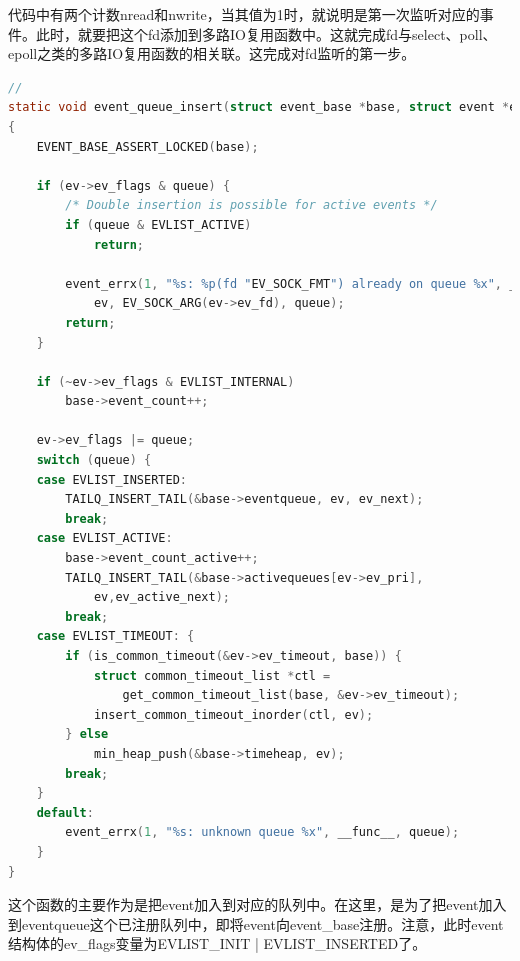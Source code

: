 \documentclass[11pt,a4paper]{article}
\begin{document}
代码中有两个计数nread和nwrite，当其值为1时，就说明是第一次监听对应的事件。此时，就要把这个fd添加到多路IO复用函数中。这就完成fd与select、poll、epoll之类的多路IO复用函数的相关联。这完成对fd监听的第一步。

\begin{lstlisting}[language=C]
//
static void event_queue_insert(struct event_base *base, struct event *ev, int queue)
{
	EVENT_BASE_ASSERT_LOCKED(base);

	if (ev->ev_flags & queue) {
		/* Double insertion is possible for active events */
		if (queue & EVLIST_ACTIVE)
			return;

		event_errx(1, "%s: %p(fd "EV_SOCK_FMT") already on queue %x", __func__,
		    ev, EV_SOCK_ARG(ev->ev_fd), queue);
		return;
	}

	if (~ev->ev_flags & EVLIST_INTERNAL)
		base->event_count++;

	ev->ev_flags |= queue;
	switch (queue) {
	case EVLIST_INSERTED:
		TAILQ_INSERT_TAIL(&base->eventqueue, ev, ev_next);
		break;
	case EVLIST_ACTIVE:
		base->event_count_active++;
		TAILQ_INSERT_TAIL(&base->activequeues[ev->ev_pri],
		    ev,ev_active_next);
		break;
	case EVLIST_TIMEOUT: {
		if (is_common_timeout(&ev->ev_timeout, base)) {
			struct common_timeout_list *ctl =
			    get_common_timeout_list(base, &ev->ev_timeout);
			insert_common_timeout_inorder(ctl, ev);
		} else
			min_heap_push(&base->timeheap, ev);
		break;
	}
	default:
		event_errx(1, "%s: unknown queue %x", __func__, queue);
	}
}
\end{lstlisting}
这个函数的主要作为是把event加入到对应的队列中。在这里，是为了把event加入到eventqueue这个已注册队列中，即将event向event\_base注册。注意，此时event结构体的ev\_flags变量为EVLIST\_INIT | EVLIST\_INSERTED了。
\end{document}
